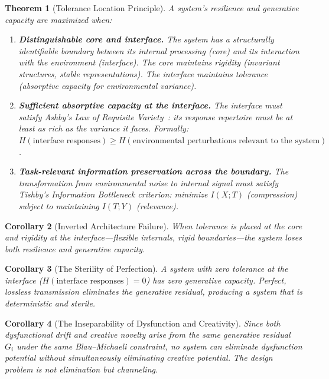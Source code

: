 \documentclass[12pt,letterpaper]{article}
\newtheorem{theorem}{Theorem}[section]
\newtheorem{corollary}[theorem]{Corollary}
\theoremstyle{definition}
\theoremstyle{remark}
\begin{document}
\begin{theorem}[Tolerance Location Principle]
A system's resilience and generative capacity are maximized when:
\begin{enumerate}
    \item \textbf{Distinguishable core and interface.} The system has a structurally identifiable boundary between its internal processing (core) and its interaction with the environment (interface). The core maintains rigidity (invariant structures, stable representations). The interface maintains tolerance (absorptive capacity for environmental variance).
    \item \textbf{Sufficient absorptive capacity at the interface.} The interface must satisfy Ashby's Law of Requisite Variety~\citep{ashby1956}: its response repertoire must be at least as rich as the variance it faces. Formally: $H(\text{interface responses}) \geq H(\text{environmental perturbations relevant to the system})$.
    \item \textbf{Task-relevant information preservation across the boundary.} The transformation from environmental noise to internal signal must satisfy Tishby's Information Bottleneck criterion: minimize $I(X; T)$ (compression) subject to maintaining $I(T; Y)$ (relevance).
\end{enumerate}
\end{theorem}

\begin{corollary}[Inverted Architecture Failure]
When tolerance is placed at the core and rigidity at the interface---flexible internals, rigid boundaries---the system loses both resilience and generative capacity.
\end{corollary}

\begin{corollary}[The Sterility of Perfection]
A system with zero tolerance at the interface ($H(\text{interface responses}) = 0$) has zero generative capacity. Perfect, lossless transmission eliminates the generative residual, producing a system that is deterministic and sterile.
\end{corollary}

\begin{corollary}[The Inseparability of Dysfunction and Creativity]
\label{cor:inseparability}
Since both dysfunctional drift and creative novelty arise from the same generative residual~$G_i$ under the same Blau--Michaeli constraint, no system can eliminate dysfunction potential without simultaneously eliminating creative potential. The design problem is not elimination but \emph{channeling}.
\end{corollary}
\end{document}
